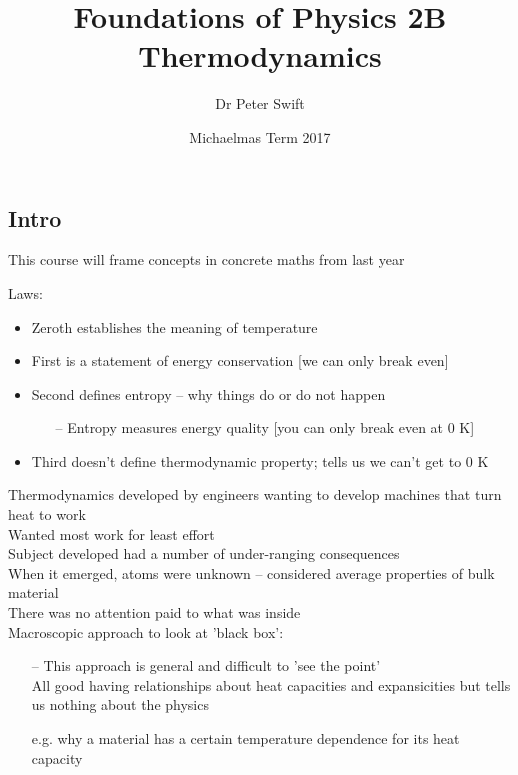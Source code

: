 \documentclass[a4paper, 11pt, normalem]{report}
\title{Foundations of Physics 2B \\ Thermodynamics \vspace{-20pt}}
\author{Dr Peter Swift}
\date{\vspace{-15pt}Michaelmas Term 2017}
\begin{document}
\maketitle
\thispagestyle{fancy}

\tableofcontents

\chapter{}
\section{Intro}
This course will frame concepts in concrete maths from last year

Laws:
\begin{itemize}
  \item Zeroth establishes the meaning of temperature
  \item First is a statement of energy conservation [we can only break even]
  \item Second defines entropy -- why things do or do not happen
  \begin{itemize}
    \item[--] Entropy measures energy quality [you can only break even at 0 K]
  \end{itemize}
  \item Third doesn't define thermodynamic property; tells us we can't get to 0 K
\end{itemize}

Thermodynamics developed by engineers wanting to develop machines that turn heat to work \\
Wanted most work for least effort \\
Subject developed had a number of under-ranging consequences \\
When it emerged, atoms were unknown -- considered average properties of bulk material \\
There was no attention paid to what was inside \\
Macroscopic approach to look at 'black box':
\begin{itemize}
  \item[--] This approach is general and difficult to 'see the point' \\
  All good having relationships about heat capacities and expansicities but tells us nothing about the physics
  \item[e.g.] why a material has a certain temperature dependence for its heat capacity
\end{itemize}
\end{document}
